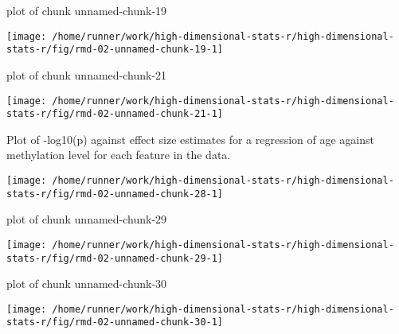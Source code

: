 \documentclass[ignorenonframetext,]{beamer}
\begin{document}
\begin{frame}{plot of chunk unnamed-chunk-19}
\protect\hypertarget{plot-of-chunk-unnamed-chunk-19}{}

\texttt{[image: /home/runner/work/high-dimensional-stats-r/high-dimensional-stats-r/fig/rmd-02-unnamed-chunk-19-1]}



\end{frame}

\begin{frame}{plot of chunk unnamed-chunk-21}
\protect\hypertarget{plot-of-chunk-unnamed-chunk-21}{}

\texttt{[image: /home/runner/work/high-dimensional-stats-r/high-dimensional-stats-r/fig/rmd-02-unnamed-chunk-21-1]}



\end{frame}

\begin{frame}{Plot of -log10(p) against effect size estimates for a
regression of age against methylation level for each feature in the
data.}
\protect\hypertarget{plot-of--log10p-against-effect-size-estimates-for-a-regression-of-age-against-methylation-level-for-each-feature-in-the-data.}{}

\texttt{[image: /home/runner/work/high-dimensional-stats-r/high-dimensional-stats-r/fig/rmd-02-unnamed-chunk-28-1]}



\end{frame}

\begin{frame}{plot of chunk unnamed-chunk-29}
\protect\hypertarget{plot-of-chunk-unnamed-chunk-29}{}

\texttt{[image: /home/runner/work/high-dimensional-stats-r/high-dimensional-stats-r/fig/rmd-02-unnamed-chunk-29-1]}



\end{frame}

\begin{frame}{plot of chunk unnamed-chunk-30}
\protect\hypertarget{plot-of-chunk-unnamed-chunk-30}{}

\texttt{[image: /home/runner/work/high-dimensional-stats-r/high-dimensional-stats-r/fig/rmd-02-unnamed-chunk-30-1]}



\end{frame}
\end{document}
